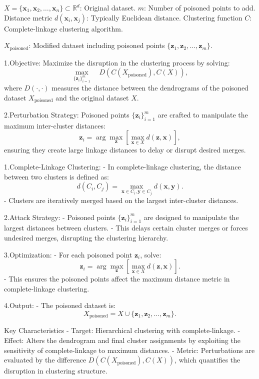 $X = \{\mathbf{x}_1, \mathbf{x}_2, \ldots, \mathbf{x}_n\} \subset \mathbb{R}^d$: Original dataset.
$m$: Number of poisoned points to add.
Distance metric $d(\mathbf{x}_i, \mathbf{x}_j)$: Typically Euclidean distance.
Clustering function $C$: Complete-linkage clustering algorithm.

$X_{\text{poisoned}}$: Modified dataset including poisoned points $\{\mathbf{z}_1, \mathbf{z}_2, \ldots, \mathbf{z}_m\}$.

1.Objective:  
   Maximize the disruption in the clustering process by solving:
   \[
   \max_{\{\mathbf{z}_i\}_{i=1}^m} \quad D(C(X_{\text{poisoned}}), C(X)),
   \]
   where $D(\cdot, \cdot)$ measures the distance between the dendrograms of the poisoned dataset $X_{\text{poisoned}}$ and the original dataset $X$.

2.Perturbation Strategy:  
   Poisoned points $\{\mathbf{z}_i\}_{i=1}^m$ are crafted to manipulate the maximum inter-cluster distances:
   \[
   \mathbf{z}_i = \arg \max_{\mathbf{z}} \left[ \max_{\mathbf{x} \in X} d(\mathbf{z}, \mathbf{x}) \right],
   \]
   ensuring they create large linkage distances to delay or disrupt desired merges.

1.Complete-Linkage Clustering:
   - In complete-linkage clustering, the distance between two clusters is defined as:
     \[
     d(C_i, C_j) = \max_{\mathbf{x} \in C_i, \mathbf{y} \in C_j} d(\mathbf{x}, \mathbf{y}).
     \]
   - Clusters are iteratively merged based on the largest inter-cluster distances.

2.Attack Strategy:
   - Poisoned points $\{\mathbf{z}_i\}_{i=1}^m$ are designed to manipulate the largest distances between clusters.
   - This delays certain cluster merges or forces undesired merges, disrupting the clustering hierarchy.

3.Optimization:
   - For each poisoned point $\mathbf{z}_i$, solve:
     \[
     \mathbf{z}_i = \arg \max_{\mathbf{z}} \left[ \max_{\mathbf{x} \in X} d(\mathbf{z}, \mathbf{x}) \right].
     \]
   - This ensures the poisoned points affect the maximum distance metric in complete-linkage clustering.

4.Output:
   - The poisoned dataset is:
     \[
     X_{\text{poisoned}} = X \cup \{\mathbf{z}_1, \mathbf{z}_2, \ldots, \mathbf{z}_m\}.
     \]

Key Characteristics
- Target: Hierarchical clustering with complete-linkage.
- Effect: Alters the dendrogram and final cluster assignments by exploiting the sensitivity of complete-linkage to maximum distances.
- Metric: Perturbations are evaluated by the difference $D(C(X_{\text{poisoned}}), C(X))$, which quantifies the disruption in clustering structure.